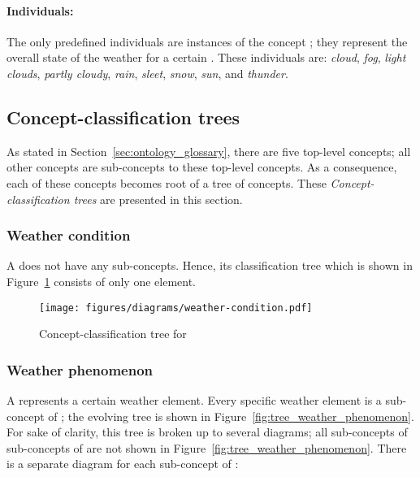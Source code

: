 \paragraph{Individuals:}

The only predefined individuals are instances of the concept ; they represent the overall state of the weather for a certain . These individuals are: \emph{cloud}, \emph{fog}, \emph{light clouds}, \emph{partly cloudy}, \emph{rain}, \emph{sleet}, \emph{snow}, \emph{sun}, and \emph{thunder}.

\subsection{Concept-classification trees}
\label{sec:concept_classification_trees}

As stated in Section~\ref{sec:ontology_glossary}, there are five top-level concepts; all other concepts are sub-concepts to these top-level concepts. As a consequence, each of these concepts becomes root of a tree of concepts. These \emph{Concept-classification trees} are presented in this section.

\subsubsection{Weather condition}

A  does not have any sub-concepts. Hence, its classification tree which is shown in Figure~\ref{fig:tree_weather_condition} consists of only one element.

\begin{figure}
  \centering
  \texttt{[image: figures/diagrams/weather-condition.pdf]}
  \caption{Concept-classification tree for }
  \label{fig:tree_weather_condition}
\end{figure}

\subsubsection{Weather phenomenon}

A  represents a certain weather element. Every specific weather element is a sub-concept of ; the evolving tree is shown in Figure~\ref{fig:tree_weather_phenomenon}. For sake of clarity, this tree is broken up to several diagrams; all sub-concepts of sub-concepts of  are not shown in Figure~\ref{fig:tree_weather_phenomenon}. There is a separate diagram for each sub-concept of :

